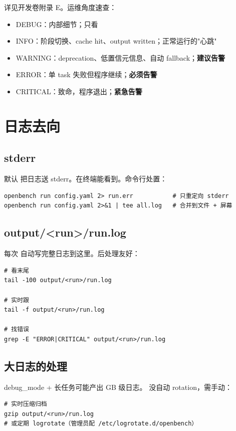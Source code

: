 详见开发卷附录 E。运维角度速查：

\begin{itemize}
  \item DEBUG：内部细节；只看
  \item INFO：阶段切换、cache hit、output written；正常运行的"心跳"
  \item WARNING：deprecation、低置信元信息、自动 fallback；\textbf{建议告警}
  \item ERROR：单 task 失败但程序继续；\textbf{必须告警}
  \item CRITICAL：致命，程序退出；\textbf{紧急告警}
\end{itemize}

\section{日志去向}

\subsection{stderr}

默认 \openbench{} 把日志送 stderr。在终端能看到。命令行处置：

\begin{verbatim}
openbench run config.yaml 2> run.err           # 只重定向 stderr
openbench run config.yaml 2>&1 | tee all.log   # 合并到文件 + 屏幕
\end{verbatim}

\subsection{output/<run>/run.log}

每次  自动写完整日志到这里。后处理友好：

\begin{verbatim}
# 看末尾
tail -100 output/<run>/run.log

# 实时跟
tail -f output/<run>/run.log

# 找错误
grep -E "ERROR|CRITICAL" output/<run>/run.log
\end{verbatim}

\subsection{大日志的处理}

debug\_mode + 长任务可能产出 GB 级日志。\openbench{} 没自动 rotation，需手动：

\begin{verbatim}
# 实时压缩归档
gzip output/<run>/run.log
# 或定期 logrotate（管理员配 /etc/logrotate.d/openbench）
\end{verbatim}

